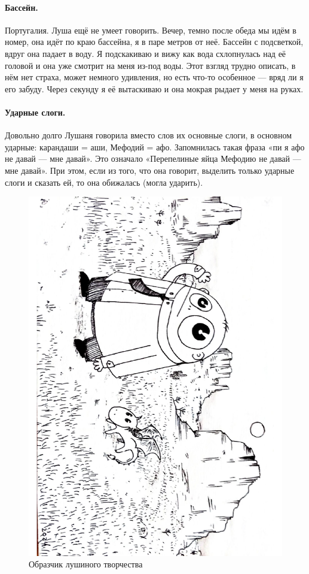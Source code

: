 \documentclass{book}
\begin{document}
\paragraph{Бассейн.} Португалия.
Луша ещё не умеет говорить.
Вечер, темно после обеда мы идём в номер, она идёт по краю бассейна, я в паре метров от неё.
Бассейн с подсветкой, вдруг она падает в воду.
Я подскакиваю и вижу как вода схлопнулась над её головой и она уже смотрит на меня из-под воды.
Этот взгляд трудно описать, в нём нет страха, может немного удивления, но есть что-то особенное --- вряд ли я его забуду.
Через секунду я её вытаскиваю и она мокрая рыдает у меня на руках.

\paragraph{Ударные слоги.} Довольно долго Лушаня говорила вместо слов их основные слоги, в основном ударные: карандаши = аши, Мефодий = афо.
Запомнилась такая фраза «пи я афо не давай --- мне давай».
Это означало «Перепелиные яйца Мефодию не давай --- мне давай».
При этом, если из того, что она говорит, выделить только ударные слоги и сказать ей, то она обижалась (могла ударить).


\begin{figure}[t!]
\centering
\includegraphics[scale=.35,angle=90]{pics/lusha-13.01.2024}
\caption*{Образчик лушиного творчества}
\end{figure}
\end{document}
